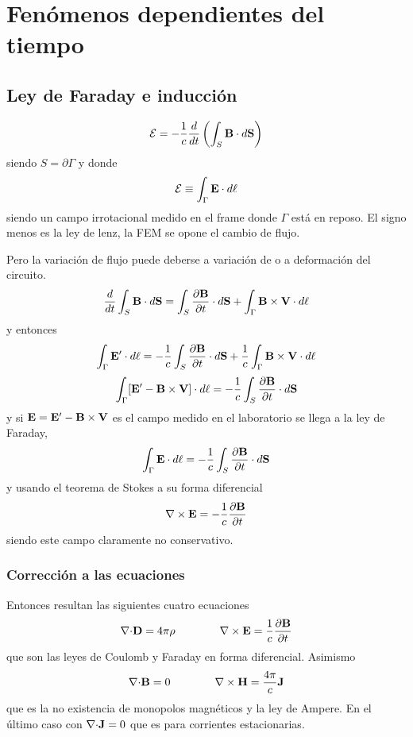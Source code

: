 \documentclass[10pt,oneside]{CBFT_book}
\begin{document}
\chapter{Fenómenos dependientes del tiempo}

\section{Ley de Faraday e inducción}

\[
	\mathcal{E} = -\frac{1}{c} \frac{d}{dt}\left( \int_S \vb{B}\cdot d\vb{S} \right)
\]
siendo $S=\partial\Gamma$ y donde 
\[
	\mathcal{E} \equiv \int_\Gamma \vb{E}\cdot d\vb{\ell}
\]
siendo  un campo irrotacional medido en el frame donde $\Gamma$ está en reposo.
El signo menos es la ley de lenz, la FEM se opone el cambio de flujo.

Pero la variación de flujo puede deberse a variación de  o a deformación del circuito.
\[
	\frac{d}{dt}\int_S \vb{B}\cdot d\vb{S} = \int_S \dpar{\vb{B}}{t}\cdot d\vb{S} +
	\int_\Gamma \vb{B}\times\vb{V} \cdot d\vb{\ell}
\]
y entonces
\[
	\int_\Gamma \vb{E}'\cdot d\vb{\ell} = -\frac{1}{c} \int_S \dpar{\vb{B}}{t}\cdot d\vb{S} +
	\frac{1}{c} \int_\Gamma \vb{B}\times\vb{V} \cdot d\vb{\ell}
\]
\[
	\int_\Gamma [\vb{E}'- \vb{B}\times\vb{V} ] \cdot d\vb{\ell} = -\frac{1}{c} \int_S \dpar{\vb{B}}{t}\cdot d\vb{S}
\]
y si $\vb{E} = \vb{E}'- \vb{B}\times\vb{V}$ es el campo medido en el laboratorio se llega a la 
ley de Faraday,
\[
	\int_\Gamma \vb{E}\cdot d\vb{\ell} = -\frac{1}{c} \int_S \dpar{\vb{B}}{t}\cdot d\vb{S}
\]
y usando el teorema de Stokes a su forma diferencial
\[
	\rotorm{E} = -\frac{1}{c} \dpar{\vb{B}}{t}
\]
siendo este campo  claramente no conservativo.

\subsection{Corrección a las ecuaciones}

Entonces resultan las siguientes cuatro ecuaciones
\[
	\divem{D} = 4 \pi \rho \qquad \qquad \rotorm{E} = \frac{1}{c} \dpar{\vb{B}}{t}
\]
que son las leyes de Coulomb y Faraday en forma diferencial. Asimismo
\[
	\divem{B} = 0 \qquad \qquad \rotorm{H} = \frac{4\pi}{c} \vb{J}
\]
que es la no existencia de monopolos magnéticos y la ley de Ampere. En el último caso con $\mathbf{\nabla}\mathbf{\cdot}\mathbf{J}=0$
que es para corrientes estacionarias.
\end{document}
